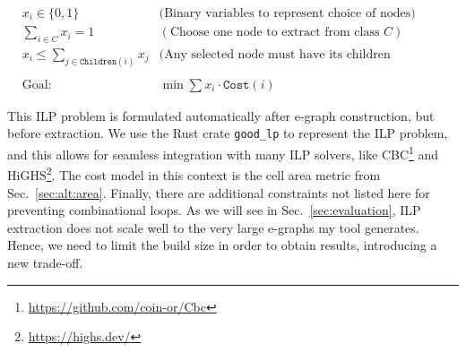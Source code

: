 \documentclass[10pt,letterpaper]{article}
\begin{document}
\begin{align}
     & x_i \in \{0, 1\} \;\;\;\;                      & \text{(Binary variables to represent choice of nodes)}            & \\
     & \sum_{i \in C} x_i = 1 \;\;\;\;                & (\text{Choose one node to extract from class } C)                 & \\
     & x_i \leq \sum_{j \in \texttt{Children}(i)} x_j & \text{(Any selected node must have its children implemented too)} & \\
    \nonumber                                                                                                               \\
     & \text{Goal: }                                  & \min \sum x_i \cdot \texttt{Cost}(i)                              &
\end{align}

This ILP problem is formulated automatically after e-graph construction, but
before extraction. We use the Rust crate \texttt{good\_lp} to represent the ILP
problem, and this allows for seamless integration with many ILP solvers, like
CBC\footnote{\href{https://github.com/coin-or/Cbc}{https://github.com/coin-or/Cbc}}
and HiGHS\footnote{\href{https://highs.dev/}{https://highs.dev/}}. The cost
model in this context is the cell area metric from Sec.~\ref{sec:alt:area}.
Finally, there are additional constraints not listed here for preventing
combinational loops. As we will see in Sec.~\ref{sec:evaluation}, ILP
extraction does not scale well to the very large e-graphs my tool generates.
Hence, we need to limit the build size in order to obtain results, introducing
a new trade-off.
\end{document}
